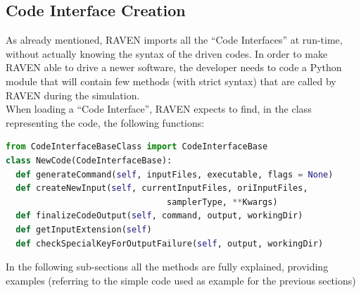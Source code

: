 \subsection{Code Interface Creation} 
\label{subsec:codeinterfacecreation}
As already mentioned, RAVEN imports all the ``Code Interfaces'' at run-time, 
without actually knowing the syntax of the driven codes. In order to make RAVEN
able to drive a newer software, the developer needs to code a Python module 
that will contain few methods (with strict syntax) that are called by RAVEN during the simulation.
\\ When loading a ``Code Interface'', RAVEN expects to find, in the class representing the code,
 the following functions:
\begin{lstlisting}[language=python]
from CodeInterfaceBaseClass import CodeInterfaceBase
class NewCode(CodeInterfaceBase):
  def generateCommand(self, inputFiles, executable, flags = None)
  def createNewInput(self, currentInputFiles, oriInputFiles,
                                samplerType, **Kwargs)                           
  def finalizeCodeOutput(self, command, output, workingDir)
  def getInputExtension(self)
  def checkSpecialKeyForOutputFailure(self, output, workingDir)
\end{lstlisting} 
In the following sub-sections all the methods are fully explained, providing examples
 (referring to the simple code used as example for the previous sections)
